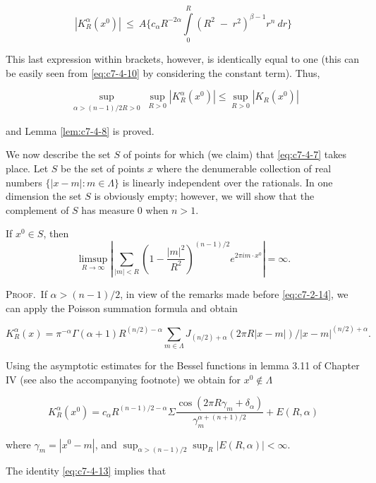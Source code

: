 \[
|K_{R}^{\alpha}(x^{0})|\ \leq\ A\Bigg\{c_{\alpha}R^{-2\alpha}\int\limits_{0}^{R}(R^{2}\;-\;r^{2})^{\beta-1}r^{n}\ d r\Bigg\}
\]

This last expression within brackets, however, is identically equal to one (this can be easily seen from \eqref{eq:c7-4-10} by considering the constant term). Thus,

\[
\sup_{\substack{\alpha>(n-1)/2R>0}}\sup_{R>0}|K_{R}^{\alpha}(x^{0})|\leq\sup_{R>0}|K_{R}(x^{0})|
\]

and Lemma \ref{lem:c7-4-8} is proved.

We now describe the set $S$ of points for which (we claim) that \eqref{eq:c7-4-7} takes place. Let $S$ be the set of points $x$ where the denumerable collection of real numbers $\{|x - m|: m \in \Lambda\}$ is linearly independent over the rationals. In one dimension the set $S$ is obviously empty; however, we will show that the complement of $S$ has measure 0 when $n > 1$.

\begin{lemma}
\label{lem:c7-4-11}
If $x^0 \in S$, then
\[
\limsup_{R\to\infty}\left|\sum_{|m|<R}\left(1-\frac{|m|^{2}}{R^{2}}\right)^{(n-1)/2}e^{2\pi i m\cdot x^{0}}\right|=\infty.
\]

\end{lemma}

\textsc{Proof.}\ If $\alpha > (n-1)/2$, in view of the remarks made before \eqref{eq:c7-2-14}, we can apply the Poisson summation formula and obtain

\begin{equation}\label{eq:c7-4-12}
K_{R}^{\alpha}(x)=\pi^{-\alpha}\Gamma(\alpha+1)R^{(n/2)-\alpha}\sum_{m\in\Lambda}J_{(n/2)+\alpha}(2\pi R|x-m|)/|x-m|^{(n/2)+\alpha}.
\end{equation}

Using the asymptotic estimates for the Bessel functions in lemma 3.11 of Chapter IV (see also the accompanying footnote) we obtain for $x^0 \not\in \Lambda$

\begin{equation}\label{eq:c7-4-13}
K_{R}^{\alpha}(x^{0})=c_{\alpha}R^{(n-1)/2-\alpha}\Sigma\frac{\cos\left(2\pi R\gamma_{m}+\delta_{\alpha}\right)}{\gamma_{m}^{\alpha+(n+1)/2}}+E(R,\alpha)
\end{equation}

where $\gamma_m = |x^0 - m|$, and $\sup_{\alpha > (n-1)/2} \sup_R |E(R, \alpha)| < \infty$.

The identity \eqref{eq:c7-4-13} implies that

